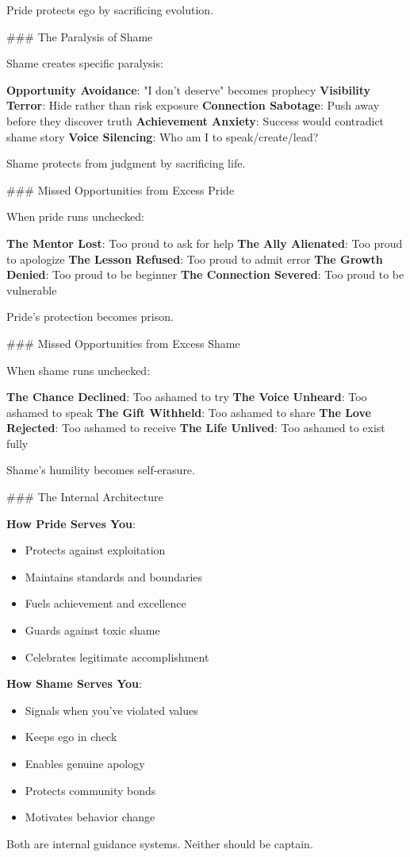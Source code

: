 \documentclass[12pt]{book}
\begin{document}
Pride protects ego by sacrificing evolution.

\#\#\# The Paralysis of Shame

Shame creates specific paralysis:

\textbf{Opportunity Avoidance}: "I don't deserve" becomes prophecy
\textbf{Visibility Terror}: Hide rather than risk exposure
\textbf{Connection Sabotage}: Push away before they discover truth
\textbf{Achievement Anxiety}: Success would contradict shame story
\textbf{Voice Silencing}: Who am I to speak/create/lead?

Shame protects from judgment by sacrificing life.

\#\#\# Missed Opportunities from Excess Pride

When pride runs unchecked:

\textbf{The Mentor Lost}: Too proud to ask for help
\textbf{The Ally Alienated}: Too proud to apologize
\textbf{The Lesson Refused}: Too proud to admit error
\textbf{The Growth Denied}: Too proud to be beginner
\textbf{The Connection Severed}: Too proud to be vulnerable

Pride's protection becomes prison.

\#\#\# Missed Opportunities from Excess Shame

When shame runs unchecked:

\textbf{The Chance Declined}: Too ashamed to try
\textbf{The Voice Unheard}: Too ashamed to speak
\textbf{The Gift Withheld}: Too ashamed to share
\textbf{The Love Rejected}: Too ashamed to receive
\textbf{The Life Unlived}: Too ashamed to exist fully

Shame's humility becomes self-erasure.

\#\#\# The Internal Architecture

\textbf{How Pride Serves You}:
\begin{itemize}
\item Protects against exploitation
\item Maintains standards and boundaries
\item Fuels achievement and excellence
\item Guards against toxic shame
\item Celebrates legitimate accomplishment

\end{itemize}
\textbf{How Shame Serves You}:
\begin{itemize}
\item Signals when you've violated values
\item Keeps ego in check
\item Enables genuine apology
\item Protects community bonds
\item Motivates behavior change

\end{itemize}
Both are internal guidance systems. Neither should be captain.
\end{document}
